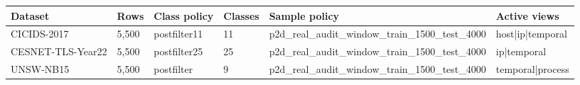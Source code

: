 \small
\begin{tabular}{llllll}
\hline
Dataset & Rows & Class policy & Classes & Sample policy & Active views \\
\hline
CICIDS-2017 & 5,500 & postfilter11 & 11 & p2d\_real\_audit\_window\_train\_1500\_test\_4000 & host|ip|temporal \\
CESNET-TLS-Year22 & 5,500 & postfilter25 & 25 & p2d\_real\_audit\_window\_train\_1500\_test\_4000 & ip|temporal \\
UNSW-NB15 & 5,500 & postfilter & 9 & p2d\_real\_audit\_window\_train\_1500\_test\_4000 & temporal|process \\
\hline
\end{tabular}
